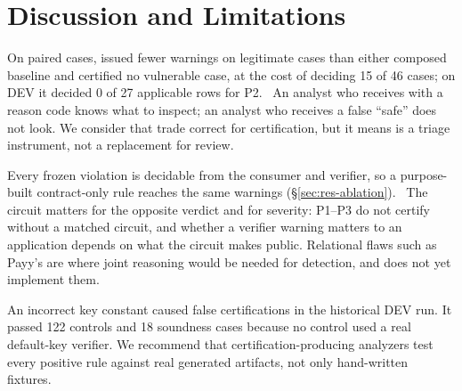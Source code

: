 \section{Discussion and Limitations}\label{sec:discussion}

 On paired cases, \tool{}
issued fewer warnings on legitimate cases than either composed baseline and
certified no vulnerable case, at the cost of deciding 15 of 46 cases; on DEV
it decided 0 of 27 applicable rows for P2.%
\
An analyst who receives \UNK{} with a reason code knows what to inspect; an
analyst who receives a false ``safe'' does not look. We consider that trade
correct for certification, but it means \tool{} is a triage instrument, not a
replacement for review.

 Every frozen
violation is decidable from the consumer and verifier, so a purpose-built
contract-only rule reaches the same warnings
(\S\ref{sec:res-ablation}).%
\
The circuit matters for the opposite verdict and for severity: P1--P3 do not
certify without a matched circuit, and whether a verifier
warning matters to an application depends on what the circuit makes public. Relational
flaws such as Payy's are where joint reasoning would be needed for
detection, and \tool{} does not yet implement them.

 An incorrect key constant caused false certifications in the historical DEV run. It passed 122 controls and 18 soundness
cases because no control used a real default-key verifier. We recommend that
certification-producing analyzers test every positive rule against real
generated artifacts, not only hand-written fixtures.%

